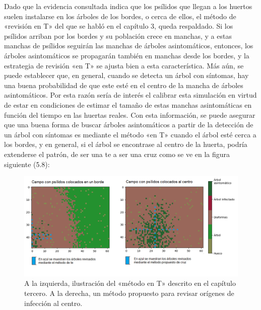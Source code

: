 Dado que la evidencia consultada indica que los psílidos que llegan a los huertos suelen instalarse en los árboles de los bordes, o cerca de ellos, el método de «revisión en T» del que se habló en el capítulo 3, queda respaldado. Si los psílidos arriban por los bordes y su población crece en manchas, y a estas manchas de psílidos seguirán las manchas de árboles asintomáticos, entonces, los árboles asintomáticos se propagarán también en manchas desde los bordes, y la estrategia de revisión «en T» se ajusta bien a esta característica.
Más aún, se puede establecer que, en general, cuando se detecta un árbol con síntomas, hay una buena probabilidad de que este esté en el centro de la mancha de árboles asintomáticos. Por esta razón sería de interés el calibrar esta simulación en virtud de estar en condiciones de estimar el tamaño de estas manchas asintomáticas en función del tiempo en las huertas reales.
Con esta información, se puede asegurar que una buena forma de buscar árboles asintomáticos a partir de la detección de un árbol con síntomas es mediante el método «en T» cuando el árbol esté cerca a los bordes, y en general, si el árbol se encontrase al centro de la huerta, podría extenderse el patrón, de ser una te a ser una cruz como se ve en la figura siguiente (5.8):
\begin{figure}[H]
\centering
\includegraphics[width=1.05\textwidth,keepaspectratio=true]{images/Imágenes C6/C6-7.png}
\caption{A la izquierda, ilustración del «método en T» descrito en el capítulo tercero. A la derecha, un método propuesto para revisar orígenes de infección al centro.}
\end{figure}
	
